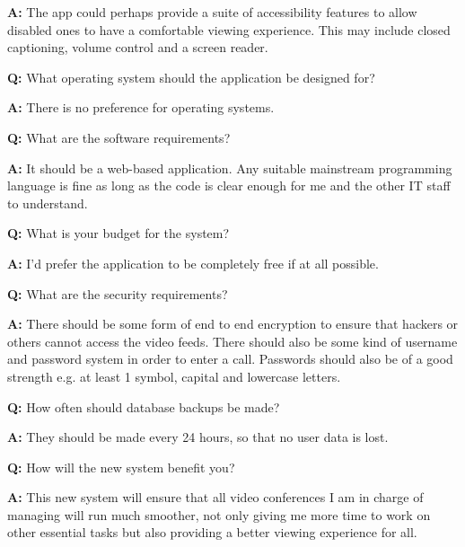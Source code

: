 \begin{tcolorbox}[
  boxrule=0pt, frame empty, colback=lightestgray, arc=0pt,
  breakable, colframe=white
]
  \textbf{A:} The app could perhaps provide a suite of 
  accessibility features to allow disabled ones to have a 
  comfortable viewing experience. This may include closed
  captioning, volume control and a screen reader.
  \vspace{0.25cm}

  \textbf{Q:} What operating system should the application be 
  designed for? \vspace{0.05cm}

  \textbf{A:} There is no preference for operating systems.
  \vspace{0.25cm}

  \textbf{Q:} What are the software requirements? 
  \vspace{0.05cm}

  \textbf{A:} It should be a web-based application. Any 
  suitable mainstream programming language is fine as long as 
  the code is clear enough for me and the other IT staff to 
  understand.
  \vspace{0.25cm}

  \textbf{Q:} What is your budget for the system?
  \vspace{0.05cm}

  \textbf{A:} I'd prefer the application to be completely free
  if at all possible. \vspace{0.25cm}

  \textbf{Q:} What are the security requirements?
  \vspace{0.05cm}

  \textbf{A:} There should be some form of end to end 
  encryption to ensure that hackers or others cannot access the
  video feeds. There should also be some kind of username and 
  password system in order to enter a call. Passwords should 
  also be of a good strength e.g. at least 1 symbol, capital
  and lowercase letters.
  \vspace{0.25cm}

  \textbf{Q:} How often should database backups be made?
  \vspace{0.05cm}

  \textbf{A:} They should be made every 24 hours, so that no 
  user data is lost.
  \vspace{0.25cm}


  \textbf{Q:} How will the new system benefit you? 
  \vspace{0.05cm}

  \textbf{A:} This new system will ensure that all video 
  conferences I am in charge of managing will run much 
  smoother, not only giving me more time to work on other 
  essential tasks but also providing a better viewing
  experience for all.

\end{tcolorbox}

